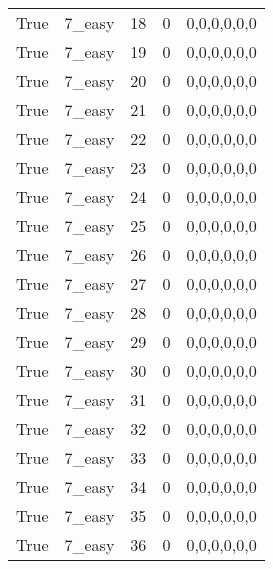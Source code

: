 \begin{tabular}{llrrl}
 True            & 7\_easy              &            18 &                     0 & 0,0,0,0,0,0   \\
 True            & 7\_easy              &            19 &                     0 & 0,0,0,0,0,0   \\
 True            & 7\_easy              &            20 &                     0 & 0,0,0,0,0,0   \\
 True            & 7\_easy              &            21 &                     0 & 0,0,0,0,0,0   \\
 True            & 7\_easy              &            22 &                     0 & 0,0,0,0,0,0   \\
 True            & 7\_easy              &            23 &                     0 & 0,0,0,0,0,0   \\
 True            & 7\_easy              &            24 &                     0 & 0,0,0,0,0,0   \\
 True            & 7\_easy              &            25 &                     0 & 0,0,0,0,0,0   \\
 True            & 7\_easy              &            26 &                     0 & 0,0,0,0,0,0   \\
 True            & 7\_easy              &            27 &                     0 & 0,0,0,0,0,0   \\
 True            & 7\_easy              &            28 &                     0 & 0,0,0,0,0,0   \\
 True            & 7\_easy              &            29 &                     0 & 0,0,0,0,0,0   \\
 True            & 7\_easy              &            30 &                     0 & 0,0,0,0,0,0   \\
 True            & 7\_easy              &            31 &                     0 & 0,0,0,0,0,0   \\
 True            & 7\_easy              &            32 &                     0 & 0,0,0,0,0,0   \\
 True            & 7\_easy              &            33 &                     0 & 0,0,0,0,0,0   \\
 True            & 7\_easy              &            34 &                     0 & 0,0,0,0,0,0   \\
 True            & 7\_easy              &            35 &                     0 & 0,0,0,0,0,0   \\
 True            & 7\_easy              &            36 &                     0 & 0,0,0,0,0,0   \\

\end{tabular}
